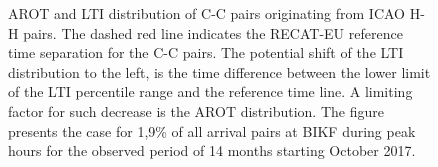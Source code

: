 \begin{figure}[h]
    \centering
    
    \vspace{0.5cm}
    

    
    \caption[AROT and LTI of C-C pairs originating from ICAO H-H pairs]{AROT and LTI distribution of C-C pairs originating from ICAO H-H pairs. The dashed red line indicates the RECAT-EU reference time separation for the C-C pairs. The potential shift of the LTI distribution to the left, is the time difference between the lower limit of the LTI percentile range and the reference time line. A limiting factor for such decrease is the AROT distribution. The figure presents the case for 1,9\% of all arrival pairs at BIKF during peak hours for the observed period of 14 months starting October 2017.}\label{fig:CC_from_HH_pairs_time_sep}
\end{figure}




